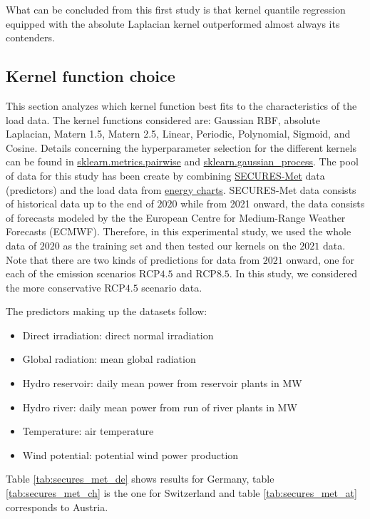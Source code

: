 What can be concluded from this first study is that kernel quantile regression equipped with the absolute Laplacian kernel outperformed almost always its contenders.

\subsection{Kernel function choice}
This section analyzes which kernel function best fits to the characteristics of the load data.
The kernel functions considered are: Gaussian RBF, absolute Laplacian, Matern 1.5, Matern 2.5, Linear, Periodic, Polynomial, Sigmoid, and Cosine. 
Details concerning the hyperparameter selection for the different kernels can be found in \href{https://scikit-learn.org/stable/modules/classes.html#module-sklearn.metrics.pairwise}{sklearn.metrics.pairwise} and \href{https://scikit-learn.org/stable/modules/classes.html#module-sklearn.gaussian_process}{sklearn.gaussian\_process}.
The pool of data for this study has been create by combining \href{https://zenodo.org/records/7907883}{SECURES-Met} data (predictors) \cite{Formayer2023} and the load data from \href{https://www.energy-charts.info/index.html?l=en&c=DE}{energy charts}.
SECURES-Met data consists of historical data up to the end of $2020$ while from 2021 onward, the data consists of forecasts modeled by the the European Centre for Medium-Range Weather Forecasts (ECMWF).
Therefore, in this experimental study, we used the whole data of $2020$ as the training set and then tested our kernels on the $2021$ data.
Note that there are two kinds of predictions for data from $2021$ onward, one for each of the emission scenarios RCP$4.5$ and RCP$8.5$. In this study, we considered the more conservative RCP$4.5$ scenario data.

The predictors making up the datasets follow:
\begin{itemize}
    \item Direct irradiation: direct normal irradiation
    \item Global radiation: mean global radiation
    \item Hydro reservoir: daily mean power from reservoir plants in MW
    \item Hydro river: daily mean power from run of river plants in MW
    \item Temperature: air temperature
    \item Wind potential: potential wind power production
\end{itemize}
Table \ref{tab:secures_met_de} shows results for Germany, table \ref{tab:secures_met_ch} is the one for Switzerland and table \ref{tab:secures_met_at} corresponds to Austria.


